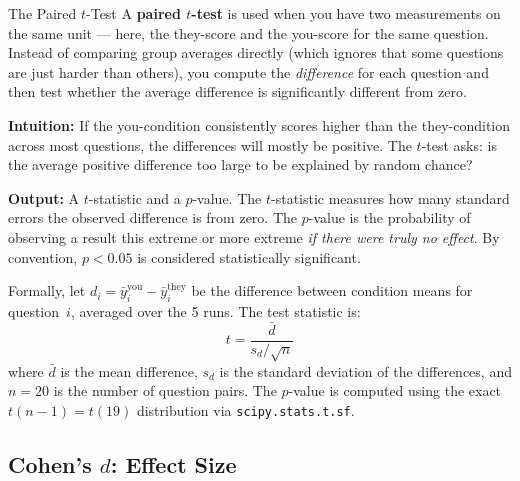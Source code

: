 \documentclass[12pt, letterpaper]{article}
\begin{document}
\begin{keyconcept}{The Paired $t$-Test}
  A \textbf{paired $t$-test} is used when you have two measurements on the same
  unit --- here, the they-score and the you-score for the same question. Instead of
  comparing group averages directly (which ignores that some questions are just harder
  than others), you compute the \emph{difference} for each question and then test
  whether the average difference is significantly different from zero.

  \textbf{Intuition:} If the you-condition consistently scores higher than the
  they-condition across most questions, the differences will mostly be positive.
  The $t$-test asks: is the average positive difference too large to be explained
  by random chance?

  \textbf{Output:} A $t$-statistic and a $p$-value. The $t$-statistic measures how
  many standard errors the observed difference is from zero. The $p$-value is the
  probability of observing a result this extreme or more extreme \emph{if there were
  truly no effect}. By convention, $p < 0.05$ is considered statistically significant.
\end{keyconcept}

Formally, let $d_i = \bar{y}_i^{\text{you}} - \bar{y}_i^{\text{they}}$ be the
difference between condition means for question~$i$, averaged over the 5 runs.
The test statistic is:
\begin{equation}
  t = \frac{\bar{d}}{s_d / \sqrt{n}}
\end{equation}
where $\bar{d}$ is the mean difference, $s_d$ is the standard deviation of the
differences, and $n = 20$ is the number of question pairs. The $p$-value is computed
using the exact $t(n-1) = t(19)$ distribution via \texttt{scipy.stats.t.sf}.

\subsection{Cohen's \texorpdfstring{$d$}{d}: Effect Size}
\end{document}
